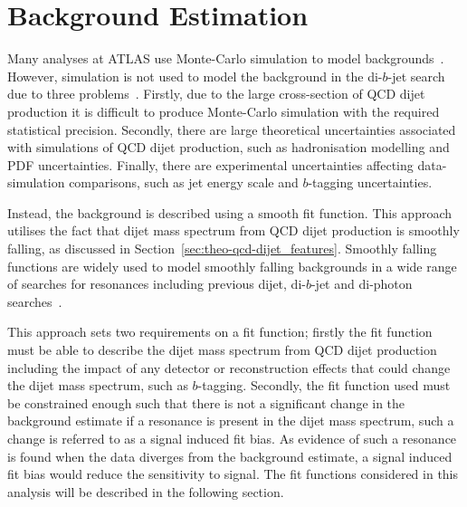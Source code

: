 


\section{Background Estimation}
\label{sec:bkg-fit}

Many analyses at ATLAS use Monte-Carlo simulation
to model backgrounds~\cite{obj-Hbb}.
However, simulation is not used to model the
background in the di-$b$-jet search due to three problems~\cite{theo-dijet_harris}.
Firstly, due to the large cross-section of QCD dijet production it is difficult to produce Monte-Carlo simulation with the required statistical precision.
Secondly, there are large theoretical uncertainties associated with simulations of QCD dijet production,
such as hadronisation modelling and PDF uncertainties.
Finally, there are experimental uncertainties affecting
data-simulation comparisons, such as jet energy scale and $b$-tagging uncertainties.

Instead, the background is described using a smooth fit function.
This approach utilises the fact that dijet mass spectrum
from QCD dijet production is smoothly falling,
as discussed in Section~\ref{sec:theo-qcd-dijet_features}.
Smoothly falling functions are widely used to model smoothly falling backgrounds in a wide range of searches for resonances
including previous dijet, di-$b$-jet and di-photon searches~\cite{dijet-mori16_paper,dibjet-mori16_paper,bkg-higgs_gammagamma}.

This approach sets two requirements on a fit function;
firstly the fit function must be able to describe the dijet mass spectrum from QCD dijet production
including the impact of any detector or reconstruction effects that could change the dijet mass spectrum, such as $b$-tagging.
Secondly, the fit function used must be constrained enough such that there is not a
significant change in the background estimate if a resonance is present in the dijet mass spectrum,
such a change is referred to as a signal induced fit bias.
As evidence of such a resonance is found when the data diverges from the background estimate,
a signal induced fit bias would reduce the sensitivity to signal.
The fit functions considered in this analysis will be described in the following section.

